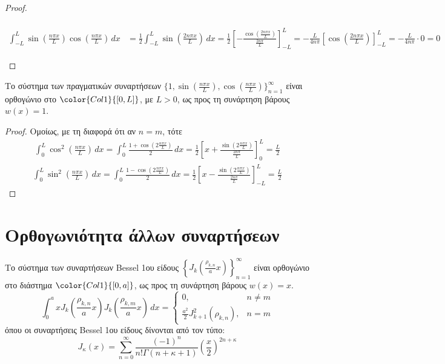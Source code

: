 \begin{proof}
\begin{myitemize}
\begin{align*}
      \end{align*}
      \begin{align*}
        \int _{-L}^{L} \sin{\left(\frac{n \pi x }{L}\right)} 
        \cos{\left(\frac{n \pi x}{L}\right)} \,{dx} 
            &= \frac{1}{2} \int _{-L}^{L} \sin{\left(\frac{2 n \pi x}{L}\right)} \,{dx} 
            = \frac{1}{2} \left[-\frac{\cos{\left(\frac{2 n \pi x}{L}\right)}}
            {\frac{2n \pi}{L}} \right]_{-L}^{L} 
            = -\frac{L}{4 n \pi} \left[\cos{\left(\frac{2n \pi x}{L}\right)} 
            \right]_{-L}^{L} = -\frac{L}{4n\pi}\cdot 0 = 0
      \end{align*}
  \end{myitemize}
\end{proof}
\begin{prop}
  Το σύστημα των πραγματικών συναρτήσεων 
  $ \{ 1, \sin{\left(\frac{n \pi x}{L}\right)}, 
  \cos{\left(\frac{n \pi x}{L}\right)} \}_{n=1}^{\infty} $ 
  είναι ορθογώνιο στο $ \color{Col1}{[0,L]} $, με $ L>0 $, ως προς τη συνάρτηση βάρους 
  $ w(x)=1 $.
\end{prop}
\begin{proof}
  Ομοίως, με τη διαφορά ότι αν $ n=m $, τότε 
  \begin{align*}
    \int _{0}^{L} \cos^{2}\left(\frac{n \pi x}{L}\right) \,{dx} = 
    \int _{0}^{L} \frac{1+ \cos{\left( 2 \frac{n \pi x}{L} \right)}}{2}
    \,{dx} = 
    \frac{1}{2} \left[x + \frac{\sin{\left(2 \frac{n \pi x}{L}\right)}}
    {\frac{2 n \pi}{L}} \right]_{0}^{L} = \frac{L}{2}
  \end{align*}
  \begin{align*}
    \int _{0}^{L} \sin^{2}\left(\frac{n \pi x}{L}\right) \,{dx} = 
    \int _{0}^{L} \frac{1- \cos{\left( 2 \frac{n \pi x}{L} \right)}}{2}
    \,{dx} = 
    \frac{1}{2} \left[x - \frac{\sin{\left(2 \frac{n \pi x}{L}\right)}}
    {\frac{2 n \pi}{L}} \right]_{-L}^{L} = \frac{L}{2}
  \end{align*}
\end{proof}

\section*{Ορθογωνιότητα άλλων συναρτήσεων}

\begin{prop}
  Το σύστημα των συναρτήσεων \textcolor{Col1}{Bessel 1ου είδους}
  $ \left\{ J_{k}\left(\frac{\rho _{k,n}}{a}x \right)\right\}_{n=1}^{\infty} $ 
  είναι ορθογώνιο στο διάστημα $ \color{Col1}{[0,a]} $, ως προς τη συνάρτηση βάρους 
  $ w(x)=x $.
  \[
    \int _{0}^{a} x J_{k}\left(\frac{\rho _{k,n}}{a}x \right)
    J_{k}\left(\frac{\rho_{k,m}}{a}x\right) \,{dx} = 
    \begin{cases}
      0, & n \neq m \\
      \frac{a^{2}}{2} J_{k+1}^{2}(\rho_{k,n}), & n=m
    \end{cases}
   \] 
  όπου οι συναρτήσεις Bessel 1ου είδους δίνονται από τον τύπο:
  \[
    J_{\kappa}(x) = \sum_{n=0}^{\infty} \frac{(-1)^{n}}{n!
    \Gamma(n+\kappa+1)}\left(\frac{x}{2}\right)^{2n+\kappa} 
  \]
\end{prop}

